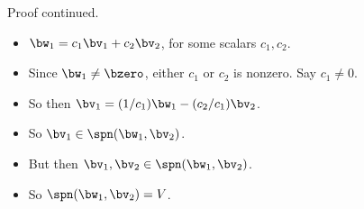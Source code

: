 \documentclass{beamer}
\begin{document}
\begin{frame}{Proof continued.}

\begin{itemize}
\item $\bw_1 = c_1\bv_1 + c_2\bv_2$, for some scalars $c_1, c_2$.
\item Since $\bw_1\not=\bzero$, either $c_1$ or $c_2$ is nonzero. Say $c_1 \not= 0$.
\item So then $\bv_1 = (1/c_1)\bw_1 - (c_2/c_1)\bv_2$.
\item So $\bv_1\in\spn(\bw_1,\bv_2)$.
\item But then $\bv_1,\bv_2\in\spn(\bw_1,\bv_2)$.
\item So $\spn(\bw_1,\bv_2)=V$.
\end{itemize}

\end{frame}
\end{document}
